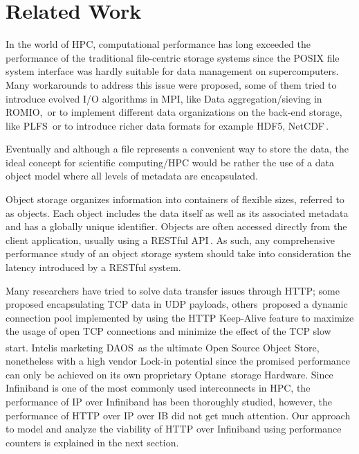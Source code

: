 \documentclass[runningheads]{llncs}
\begin{document}
\section {Related Work} \label{sec:related}

In the world of HPC, computational performance has long exceeded the performance of the traditional file-centric storage systems since the POSIX file system interface was hardly suitable for data management on supercomputers\cite{zadok2017posix}.
Many workarounds to address this issue were proposed, some of them tried to introduce evolved I/O algorithms in MPI, like Data aggregation/sieving in ROMIO,\,\cite{datasievingromio} or to implement different data organizations on the back-end storage, like PLFS\,\cite{bent2009plfs} or to introduce richer data formats for example HDF5, NetCDF\,\cite{hdf5}.

Eventually and although a file represents a convenient way to store the data, the ideal concept for scientific computing/HPC would be rather the use of a data object model\cite{liu2018evaluation} where all levels of metadata are encapsulated. 

Object storage organizes information into containers of flexible sizes, referred to as objects. Each object includes the data itself as well as its associated metadata and has a globally unique identifier.
Objects are often accessed directly from the client application, usually using a RESTful API\,\cite{richardson2008restful}.
As such, any comprehensive performance study of an object storage system should take into consideration the latency introduced by a RESTful system.

Many researchers have tried to solve data transfer issues through HTTP; some\,\cite{forest} proposed encapsulating TCP data in UDP payloads, others\,\cite {Devresse} proposed a dynamic connection pool implemented by using the HTTP Keep-Alive feature to maximize the usage of open TCP connections and minimize the effect of the TCP slow start. Intel\textsuperscript \textregistered  is marketing DAOS\,\cite{DAOS} as the ultimate Open Source Object Store, nonetheless with a high vendor Lock-in potential since the promised performance can only be achieved on its own proprietary Optane\,\cite{Optane} storage Hardware.
Since Infiniband \cite{Infiniband} is one of the most commonly used interconnects in HPC, the performance of IP over Infiniband \cite{bortolotti2011comparison,grant2010study} has been thoroughly studied, however, the performance of HTTP over IP over IB did not get much attention. Our approach to model and analyze the viability of HTTP over Infiniband using performance counters is explained in the next section.
\end{document}
